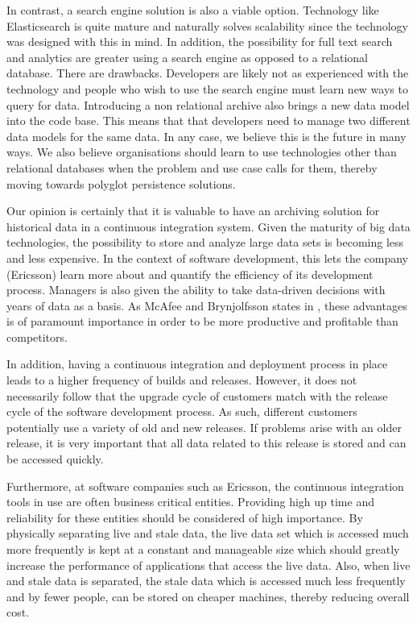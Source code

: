 In contrast, a search engine solution is also a viable option. Technology like Elasticsearch is quite mature and naturally solves scalability since the technology was designed with this in mind. In addition, the possibility for full text search and analytics are greater using a search engine as opposed to a relational database. There are drawbacks. Developers are likely not as experienced with the technology and people who wish to use the search engine must learn new ways to query for data. Introducing a non relational archive also brings a new data model into the code base. This means that that developers need to manage two different data models for the same data. In any case, we believe this is the future in many ways. We also believe organisations should learn to use technologies other than relational databases when the problem and use case calls for them, thereby moving towards polyglot persistence solutions.

Our opinion is certainly that it is valuable to have an archiving solution for historical data in a continuous integration system. Given the maturity of big data technologies, the possibility to store and analyze large data sets is becoming less and less expensive. In the context of software development, this lets the company (Ericsson) learn more about and quantify the efficiency of its development process. Managers is also given the ability to take data-driven decisions with years of data as a basis. As McAfee and Brynjolfsson states in \cite{bigDataMane}, these advantages is of paramount importance in order to be more productive and profitable than competitors.

In addition, having a continuous integration and deployment process in place leads to a higher frequency of builds and releases. However, it does not necessarily follow that the upgrade cycle of customers match with the release cycle of the software development process. As such, different customers potentially use a variety of old and new releases. If problems arise with an older release, it is very important that all data related to this release is stored and can be accessed quickly.

Furthermore, at software companies such as Ericsson, the continuous integration tools in use are often business critical entities. Providing high up time and reliability for these entities should be considered of high importance. By physically separating live and stale data, the live data set which is accessed much more frequently is kept at a constant and manageable size which should greatly increase the performance of applications that access the live data. Also, when live and stale data is separated, the stale data which is accessed much less frequently and by fewer people, can be stored on cheaper machines, thereby reducing overall cost.


